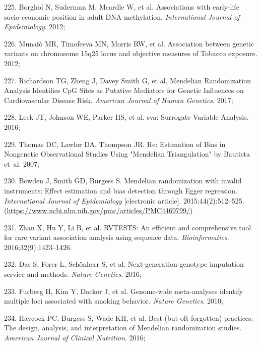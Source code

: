 \documentclass[11pt,oneside]{bristolthesis}
\newenvironment{cslreferences}%
  {}%
  {\par}
\begin{document}
\begin{cslreferences}
\leavevmode\hypertarget{ref-Borghol2012}{}%
225. Borghol N, Suderman M, Mcardle W, et al. Associations with early-life socio-economic position in adult DNA methylation. \emph{International Journal of Epidemiology}. 2012;

\leavevmode\hypertarget{ref-Munafo2012}{}%
226. Munafò MR, Timofeeva MN, Morris RW, et al. Association between genetic variants on chromosome 15q25 locus and objective measures of Tobacco exposure. 2012;

\leavevmode\hypertarget{ref-Richardson2017}{}%
227. Richardson TG, Zheng J, Davey Smith G, et al. Mendelian Randomization Analysis Identifies CpG Sites as Putative Mediators for Genetic Influences on Cardiovascular Disease Risk. \emph{American Journal of Human Genetics}. 2017;

\leavevmode\hypertarget{ref-Leek2016}{}%
228. Leek JT, Johnson WE, Parker HS, et al. sva: Surrogate Variable Analysis. 2016;

\leavevmode\hypertarget{ref-Thomas2007}{}%
229. Thomas DC, Lawlor DA, Thompson JR. Re: Estimation of Bias in Nongenetic Observational Studies Using "Mendelian Triangulation" by Bautista et~al. 2007;

\leavevmode\hypertarget{ref-Bowden2015}{}%
230. Bowden J, Smith GD, Burgess S. Mendelian randomization with invalid instruments: Effect estimation and bias detection through Egger regression. \emph{International Journal of Epidemiology} {[}electronic article{]}. 2015;44(2):512--525. (\url{https://www.ncbi.nlm.nih.gov/pmc/articles/PMC4469799/})

\leavevmode\hypertarget{ref-Zhan2016}{}%
231. Zhan X, Hu Y, Li B, et al. RVTESTS: An efficient and comprehensive tool for rare variant association analysis using sequence data. \emph{Bioinformatics}. 2016;32(9):1423--1426.

\leavevmode\hypertarget{ref-Das2016}{}%
232. Das S, Forer L, Schönherr S, et al. Next-generation genotype imputation service and methods. \emph{Nature Genetics}. 2016;

\leavevmode\hypertarget{ref-Furberg2010}{}%
233. Furberg H, Kim Y, Dackor J, et al. Genome-wide meta-analyses identify multiple loci associated with smoking behavior. \emph{Nature Genetics}. 2010;

\leavevmode\hypertarget{ref-Haycock2016}{}%
234. Haycock PC, Burgess S, Wade KH, et al. Best (but oft-forgotten) practices: The design, analysis, and interpretation of Mendelian randomization studies. \emph{American Journal of Clinical Nutrition}. 2016;


\end{cslreferences}
\end{document}
